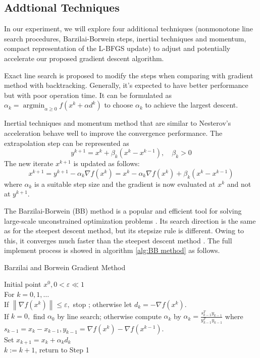 \subsection{Addtional Techniques}
In our experiment, we will explore four additional techniques (nonmonotone line search procedures, Barzilai-Borwein steps, inertial techniques and momentum, compact representation of the L-BFGS update) to adjust and potentially accelerate our proposed gradient descent algorithm. 

Exact line search is proposed to modify the steps when comparing with gradient method with backtracking. Generally, it's expected to have better performance but with poor operation time. It can be formulated as $\alpha_{k}=\operatorname{argmin}_{\alpha \geq 0} f\left(x^{k}+\alpha d^{k}\right)$ to choose $\alpha_{k}$ to achieve the largest descent. 

Inertial techniques and momentum method that are similar to Nesterov’s acceleration behave well to improve the convergence performance. The extrapolation step can be represented as $$
y^{k+1}=x^{k}+\beta_{k}\left(x^{k}-x^{k-1}\right), \quad \beta_{k}>0
$$
The new iterate $x^{k+1}$ is updated as follows:
$$
x^{k+1}=y^{k+1}-\alpha_{k} \nabla f\left(x^{k}\right)=x^{k}-\alpha_{k} \nabla f\left(x^{k}\right)+\beta_{k}\left(x^{k}-x^{k-1}\right)
$$
where $\alpha_{k}$ is a suitable step size and the gradient is now evaluated at $x^{k}$ and not at $y^{k+1} $.

The Barzilai-Borwein (BB) method is a popular and efficient tool for solving large-scale unconstrained optimization problems \cite{raydan1997barzilai}. Its search direction is the same as for the steepest descent method, but its stepsize rule is different. Owing to this, it converges much faster than the steepest descent method \cite{burdakov2019stabilized}. The full implement process is showed in algorithm \ref{alg:BB method} as follows.

\begin{algorithm}[H]
  \caption{Barzilai and Borwein Gradient Method}
  \label{alg:BB method}
  \begin{algorithmic}[1]
  \REQUIRE
Initial point $x^{0},0<\varepsilon \ll 1 $ \\
  \STATE For $k=0,1, \ldots$ \\
  \STATE If $\left\|\nabla f\left(x^{k}\right)\right\| \leq \varepsilon,$ stop ; otherwise let $d_{k}=-\nabla f\left(x^{k}\right)$. \\
  \STATE If $k=0,$ find $\alpha_{0}$ by line search; otherwise compute $\alpha_{k}$ by 
  $
  \alpha_{k}=\frac{s_{k-1}^{T} y_{k-1}}{y_{k-1}^{T} y_{k-1}}
  $
  where $s_{k-1}=x_{k}-x_{k-1}, y_{k-1}=\nabla f\left(x^{k}\right)-\nabla f\left(x^{k-1}\right)$. \\
  \STATE Set $x_{k+1}=x_{k}+\alpha_{k} d_{k}$ \\
  \STATE $k:=k+1$, return to Step 1 \\
  \end{algorithmic}
\end{algorithm}

